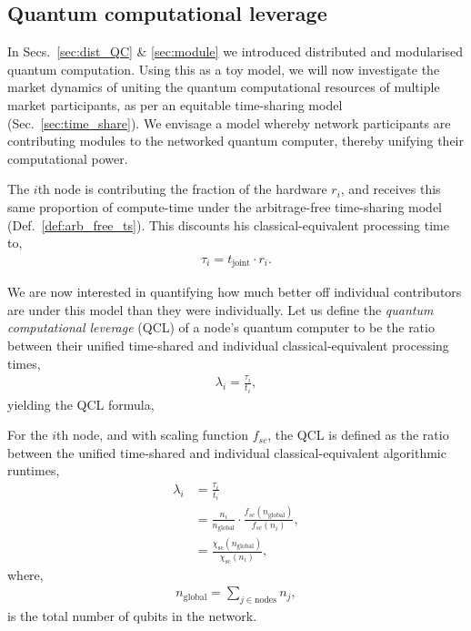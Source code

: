 %
%

\subsection{Quantum computational leverage}\label{sec:quant_ec_lev}

In Secs.~\ref{sec:dist_QC} \& \ref{sec:module} we introduced distributed and modularised quantum computation. Using this as a toy model, we will now investigate the market dynamics of uniting the quantum computational resources of multiple market participants, as per an equitable time-sharing model (Sec.~\ref{sec:time_share}). We envisage a model whereby network participants are contributing modules to the networked quantum computer, thereby unifying their computational power.

The $i$th node is contributing the fraction of the hardware $r_i$, and receives this same proportion of compute-time under the arbitrage-free time-sharing model (Def.~\ref{def:arb_free_ts}). This discounts his classical-equivalent processing time to,
\begin{align}
\tau_i = t_\text{joint} \cdot r_i.
\end{align}

We are now interested in quantifying how much better off individual contributors are under this model than they were individually. Let us define the \textit{quantum computational leverage} (QCL) of a node's quantum computer to be the ratio between their unified time-shared and individual classical-equivalent processing times,
\begin{align}
\lambda_i = \frac{\tau_i}{t_i},
\end{align}
yielding the QCL formula,

\begin{definition} \label{def:quant_econ_lev}
For the $i$th node, and with scaling function $f_{sc}$, the QCL is defined as the ratio between the unified time-shared and individual classical-equivalent algorithmic runtimes,
\begin{align}
\lambda_i &= \frac{\tau_i}{t_i} \nonumber \\
&= \frac{n_i}{n_\text{global}} \cdot \frac{f_{sc}(n_\text{global})}{f_{sc}(n_i)}, \nonumber \\
&= \frac{\chi_\text{sc}(n_\text{global})}{\chi_\text{sc}(n_i)},
\end{align}
where,
\begin{align}
	n_\text{global} = \sum_{j\in \text{nodes}} n_j,
\end{align}
is the total number of qubits in the network.
\end{definition}

